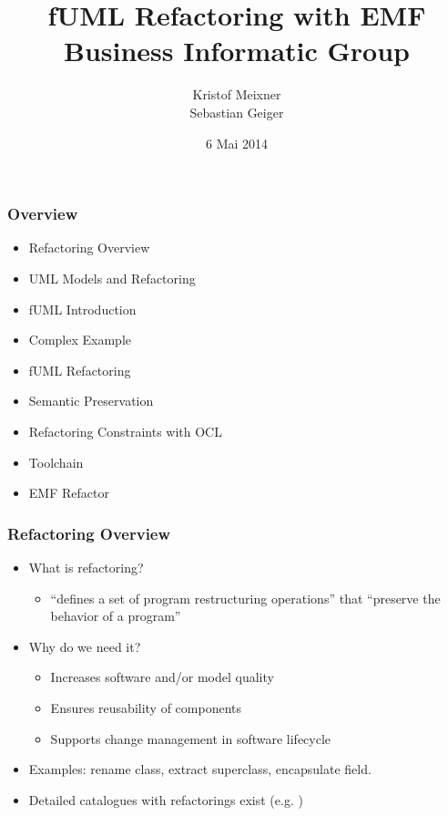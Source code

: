 \documentclass{beamer}
\begin{document}
\author{Kristof Meixner \\ Sebastian Geiger}
\date{6 Mai 2014}
\title{fUML Refactoring with EMF\\\small{Business Informatic Group}}

\begin{frame}
 \maketitle
\end{frame}


\begin{frame}
 \frametitle{Overview}



\begin{itemize}
 \item Refactoring Overview
 \item UML Models and Refactoring
 \item fUML Introduction
 \item Complex Example
 \item fUML Refactoring
 \item Semantic Preservation
 \item Refactoring Constraints with OCL
 \item Toolchain
 \item EMF Refactor
\end{itemize}

\end{frame}

\begin{frame}[fragile]
\frametitle{Refactoring Overview}
\begin{itemize}
 \item What is refactoring?
 \begin{itemize}
  \item ``defines a set of program restructuring operations'' that ``preserve the behavior of a program'' \cite{mast:REFOOF}
 \end{itemize}
 \item Why do we need it?
 \begin{itemize}
  \item Increases software and/or model quality
  \item Ensures reusability of components
  \item Supports change management in software lifecycle
 \end{itemize}
 \item Examples: rename class, extract superclass, encapsulate field.
 \item Detailed catalogues with refactorings exist (e.g. \cite{fow99})
\end{itemize}

\end{frame}
\end{document}
